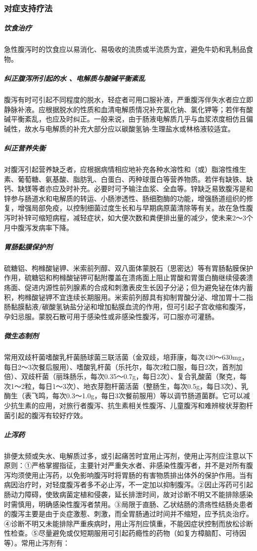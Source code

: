 \subsubsection{对症支持疗法}

\subparagraph{饮食治疗}

急性腹泻时的饮食应以易消化、易吸收的流质或半流质为宜，避免牛奶和乳制品食物。

\subparagraph{纠正腹泻所引起的水 、电解质与酸碱平衡紊乱}

腹泻有时可引起不同程度的脱水，轻症者可用口服补液，严重腹泻伴失水者应立即静脉补液。应根据脱水的性质和血清电解质情况补充氯化钠、氯化钾等；若伴有酸碱平衡紊乱，也应及时纠正。一般来说，由于肠液电解质几乎与血浆浓度相仿且偏碱性，故水与电解质的补充大部分应以碳酸氢钠-生理盐水或林格液较适宜。

\subparagraph{纠正营养失衡}

对腹泻引起营养缺乏者，应根据病情相应地补充各种水溶性和（或）脂溶性维生素、葡萄糖、氨基酸、脂肪乳、白蛋白、丙种球蛋白等营养物质。若伴有缺铁、缺钙、缺镁等者亦应及时补充。必要时可予输注血浆、全血等。锌缺乏易致腹泻是和锌参与肠道水和电解质的转运、小肠渗透性、肠细胞酶的功能，增强肠道组织的修复，增强局部免疫，以控制细菌过度生长和与早期病原菌清除等有关。故在急性腹泻时补锌可缩短病程，减轻症状，如大便次数和粪便排出量的减少，使未来2～3个月中腹泻发病率下降。

\subparagraph{胃肠黏膜保护剂}

硫糖铝、枸橼酸铋钾、米索前列醇、双八面体蒙脱石（思密达）等有胃肠黏膜保护作用，硫糖铝和枸橼酸铋钾可黏附覆盖在溃疡面上阻止胃酸和胃蛋白酶继续侵袭溃疡面、促进内源性前列腺素的合成和刺激表皮生长因子分泌；但为避免铋在体内蓄积，枸橼酸铋钾不宜连续长期服用。米索前列醇具有抑制胃酸分泌、增加胃十二指肠黏膜黏液/碳酸氢钠盐分泌和增加黏膜血流的作用，但可引起子宫收缩和腹泻，孕妇忌服。蒙脱石散可用于感染性或非感染性腹泻，可口服亦可灌肠。

\subparagraph{微生态制剂}

常用双歧杆菌嗜酸乳杆菌肠球菌三联活菌（金双歧，培菲康，每次420～630mg，每日2～3次餐后服用）、嗜酸乳杆菌（乐托尔，每次2粒口服，每日2次，首剂加倍）、双歧杆菌（丽珠肠乐，每次0.35～0.7g，每日2次）、复合乳酸菌（聚克，每次1～2粒，每日1～3次）、地衣芽胞杆菌活菌（整肠生，每次0.5g，每日3次）、乳酶生（表飞鸣，每次0.3～1.0g，每日3次餐前服用）等以调节肠道菌群。它可以减少抗生素的应用，对旅行者腹泻、抗生素相关性腹泻、儿童腹泻和难辨梭状芽胞杆菌引起的腹泻有较好疗效。

\subparagraph{止泻药}

排便太频或失水、电解质过多，或引起痛苦时宜用止泻剂，使用止泻剂应注意以下原则：①严格掌握指征，主要针对严重失水者、非感染性腹泻者，并不是对所有腹泻均须使用止泻药，以免影响腹泻时将胃肠的有害物质排出体外的保护作用。当有病因治疗时，对轻度腹泻者多不必止泻，不一定加以抑制腹泻。②因止泻药可引起肠动力障碍，使致病菌定植和侵袭，延长排泄时间，故对诊断不明又不能排除感染时需慎用，明确感染性腹泻者禁用。③局限于直肠、乙状结肠的溃疡性结肠炎患者的腹泻主要是由于炎症激惹、刺激，而全胃肠通过时间并不缩短，应予抗炎治疗。④诊断不明又未能排除严重疾病时，用止泻剂应慎重，不能因症状控制而放松诊断性检查。⑤尽量避免或仅短期服用可引起药瘾性的药物（如复方樟脑酊、可待因等）。常用止泻剂有：


